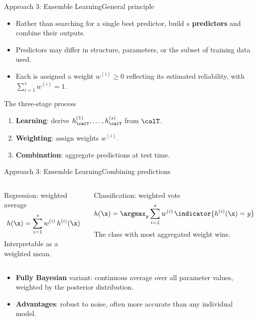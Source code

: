 \begin{frame}{Approach 3: Ensemble Learning}{General principle}
  \begin{itemize}
    \item Rather than searching for a single best predictor, build $s$
          \textcolor{AccentBlue}{\textbf{predictors}} and combine their outputs.
    \item Predictors may differ in structure, parameters, or the subset of training data
          used.
    \item Each is assigned a weight $w^{(i)} \geq 0$ reflecting its estimated reliability,
          with $\sum_{i=1}^s w^{(i)} = 1$.
  \end{itemize}
  \bigskip
  \begin{block}{The three-stage process}
    \begin{enumerate}
      \item \textbf{Learning}: derive $h^{(1)}_\calT, \ldots, h^{(s)}_\calT$ from $\calT$.
      \item \textbf{Weighting}: assign weights $w^{(i)}$.
      \item \textbf{Combination}: aggregate predictions at test time.
    \end{enumerate}
  \end{block}
\end{frame}

\begin{frame}{Approach 3: Ensemble Learning}{Combining predictions}
  \begin{columns}[T]
    \begin{block}{Regression: weighted average}
      \[
        h(\x) = \sum_{i=1}^s w^{(i)}\, h^{(i)}(\x)
      \]
      Interpretable as a weighted mean.
    \end{block}
    \begin{block}{Classification: weighted vote}
      \[
        h(\x) = \argmax_y \sum_{i=1}^s w^{(i)}\, \indicator{h^{(i)}(\x)=y}
      \]
      The class with most aggregated weight wins.
    \end{block}
  \end{columns}
  \bigskip
  \begin{itemize}
    \item \textcolor{AccentBlue}{\textbf{Fully Bayesian}} variant: continuous average over
          all parameter values, weighted by the posterior distribution.
    \item \textbf{Advantages}: robust to noise, often more accurate than any individual model.
  \end{itemize}
\end{frame}

